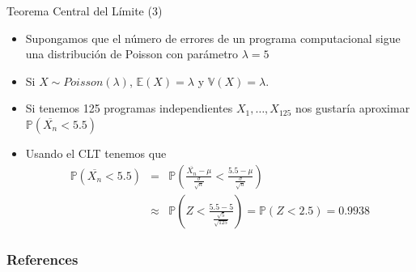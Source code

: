 \documentclass[handout]{beamer}
\begin{document}
\begin{frame}{Teorema Central del Límite (3)}
\scriptsize{
\begin{itemize}
 \item Supongamos que el número de errores de un programa computacional sigue una distribución de Poisson con parámetro $\lambda=5$
 \item Si $X \sim Poisson(\lambda)$, $\mathbb{E}(X)=\lambda$ y $\mathbb{V}(X)=\lambda$.
 \item Si tenemos 125 programas independientes $X_{1},\dots,X_{125}$ nos gustaría aproximar $\mathbb{P}(\overline{X_{n}} < 5.5)$
 \item Usando el CLT tenemos que
 \begin{eqnarray*}
 \mathbb{P}(\overline{X_{n}} < 5.5) & = & \mathbb{P} \left( \frac{\overline{X_{n}}-\mu}{\frac{\sigma}{\sqrt{n}}} <  \frac{5.5 -\mu}{\frac{\sigma}{\sqrt{n}}}  \right) \nonumber \\ 
                                    & \approx & \mathbb{P}\left( Z < \frac{5.5 - 5}{\frac{\sqrt{5}}{\sqrt{125}}}  \right) = \mathbb{P}( Z < 2.5) =0.9938
\end{eqnarray*}

\end{itemize}





}
 
\end{frame}





\begin{frame}[allowframebreaks]\scriptsize
\frametitle{References}


%
\end{frame}  










\end{document}
